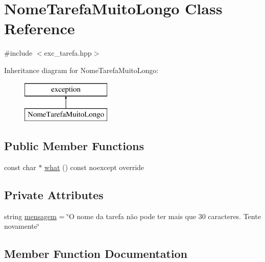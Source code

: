 \hypertarget{classNomeTarefaMuitoLongo}{}\section{Nome\+Tarefa\+Muito\+Longo Class Reference}
\label{classNomeTarefaMuitoLongo}


{\ttfamily \#include $<$exc\+\_\+tarefa.\+hpp$>$}

Inheritance diagram for Nome\+Tarefa\+Muito\+Longo\+:\begin{figure}[H]
\begin{center}
\leavevmode
\includegraphics[height=2.000000cm]{classNomeTarefaMuitoLongo}
\end{center}
\end{figure}
\subsection*{Public Member Functions}
\begin{DoxyCompactItemize}
\item 
const char $\ast$ \hyperlink{classNomeTarefaMuitoLongo_af174669e16f0604829cd61d03809ed75}{what} () const noexcept override
\end{DoxyCompactItemize}
\subsection*{Private Attributes}
\begin{DoxyCompactItemize}
\item 
string \hyperlink{classNomeTarefaMuitoLongo_a72f730ba8580b5cd8efc1cee8f9ca4c9}{mensagem} = \char`\"{}O nome da tarefa não pode ter mais que 30 caracteres. Tente novamente\char`\"{}
\end{DoxyCompactItemize}


\subsection{Member Function Documentation}
\mbox{\label{classNomeTarefaMuitoLongo_af174669e16f0604829cd61d03809ed75}} 

